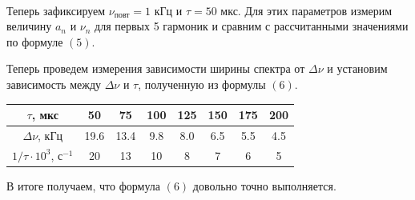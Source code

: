 \documentclass[a4paper,12pt]{article}
\begin{document}
\begin{figure}
    \\
\end{figure}

Теперь зафиксируем $\nu_{\text{повт}} = 1$ кГц и $\tau = 50$ мкс. Для этих параметров измерим величину $a_n$ и $\nu_n$ для первых 5 гармоник и сравним с рассчитанными значениями по формуле $(5)$.

Теперь проведем измерения зависимости ширины спектра от $\Delta \nu$ и установим зависимость между $\Delta \nu$ и $\tau$, полученную из формулы $(6)$.
\begin{center}
\begin{tabular}{|c|c|c|c|c|c|c|c|}
\hline
$\tau$, мкс & 50 & 75 & 100 & 125 & 150 & 175 & 200 \\ \hline
$\Delta \nu$, кГц & 19.6 & 13.4 & 9.8 & 8.0 & 6.5 & 5.5 & 4.5 \\ \hline
$1/\tau \cdot 10^3$, с$^{-1}$ & 20 & 13 & 10 & 8 & 7 & 6 & 5 \\ \hline
\end{tabular}
\end{center}
\begin{center}
\end{center}
В итоге получаем, что формула $(6)$ довольно точно выполняется.
\newpage
\end{document}
